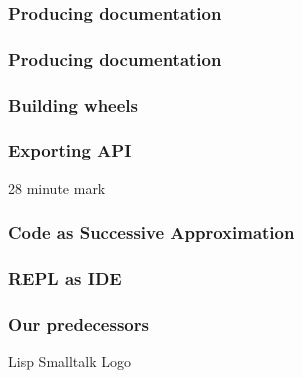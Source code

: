 \begin{frame}
\frametitle{Producing documentation}
\end{frame}

\begin{frame}
\frametitle{Producing documentation}
\end{frame}

\begin{frame}
\frametitle{Building wheels}
\end{frame}

\begin{frame}
\frametitle{Exporting API}
\end{frame}

28 minute mark

\begin{frame}
\frametitle{Code as Successive Approximation}
\end{frame}

\begin{frame}
\frametitle{REPL as IDE}
\end{frame}

\begin{frame}
\frametitle{Our predecessors}
Lisp
Smalltalk
Logo
\end{frame}


